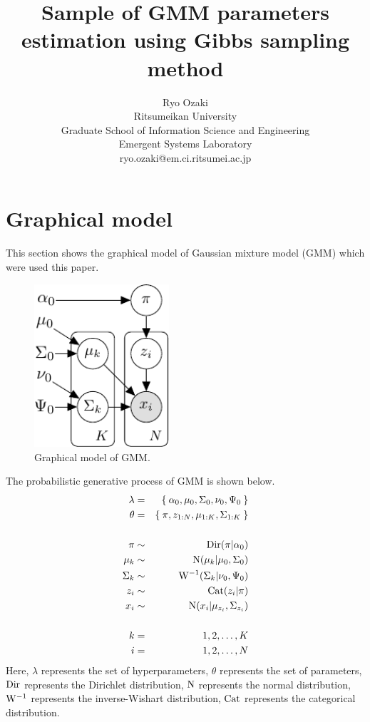 \documentclass[a4paper]{article}
\title{Sample of GMM parameters estimation using Gibbs sampling method}
\author{Ryo Ozaki\\Ritsumeikan University\\Graduate School of Information Science and Engineering\\Emergent Systems Laboratory\\ryo.ozaki@em.ci.ritsumei.ac.jp}
\begin{document}
\maketitle
\section{Graphical model}
This section shows the graphical model of Gaussian mixture model (GMM) which were used this paper.
\begin{figure}[ht]
	\begin{center}
		\includegraphics[width=5cm]{fig/GMM_graphical_model.pdf}
		\caption{Graphical model of GMM.}
	\end{center}
\end{figure}

The probabilistic generative process of GMM is shown below.
\begin{eqnarray}
	\lambda &=& \Set{ \alpha_0, \mu_0, \Sigma_0, \nu_0, \Psi_0 } \\
	\theta &=& \Set{ \pi, z_{1:N}, \mu_{1:K}, \Sigma_{1:K} } \\
	\nonumber \\
	\pi &\sim& {\rm Dir}(\pi | \alpha_0) \\
	\mu_k &\sim& {\rm N}(\mu_k | \mu_0, \Sigma_0) \\
	\Sigma_k &\sim& {\rm W}^{-1}(\Sigma_k | \nu_0, \Psi_0) \\
	z_i &\sim& {\rm Cat}(z_i | \pi) \\
	x_i &\sim& {\rm N}(x_i | \mu_{z_i}, \Sigma_{z_i})\\
	\nonumber \\
	k &=& 1, 2, \ldots, K\\
	i &=& 1, 2, \ldots, N
\end{eqnarray}
Here, $\lambda$ represents the set of hyperparameters, $\theta$ represents the set of parameters, ${\rm Dir}$ represents the Dirichlet distribution, ${\rm N}$ represents the normal distribution, ${\rm W}^{-1}$ represents the inverse-Wishart distribution, ${\rm Cat}$ represents the categorical distribution.
\end{document}
